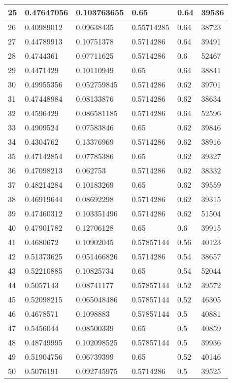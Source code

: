 \begin{longtable}{|l|l|l|l|l|l|}
25 & 0.47647056 & 0.103763655 & 0.65 & 0.64 & 39536 \\ \hline 
26 & 0.40989012 & 0.09638435 & 0.55714285 & 0.64 & 38723 \\ \hline 
27 & 0.44789913 & 0.10751378 & 0.5714286 & 0.64 & 39491 \\ \hline 
28 & 0.4744361 & 0.07711625 & 0.5714286 & 0.6 & 52467 \\ \hline 
29 & 0.4471429 & 0.10110949 & 0.65 & 0.64 & 38841 \\ \hline 
30 & 0.49955356 & 0.052759845 & 0.5714286 & 0.62 & 39701 \\ \hline 
31 & 0.47448984 & 0.08133876 & 0.5714286 & 0.62 & 38634 \\ \hline 
32 & 0.4596429 & 0.086581185 & 0.5714286 & 0.64 & 52596 \\ \hline 
33 & 0.4909524 & 0.07583846 & 0.65 & 0.62 & 39846 \\ \hline 
34 & 0.4304762 & 0.13376969 & 0.5714286 & 0.62 & 38916 \\ \hline 
35 & 0.47142854 & 0.07785386 & 0.65 & 0.62 & 39327 \\ \hline 
36 & 0.47098213 & 0.062753 & 0.5714286 & 0.62 & 38332 \\ \hline 
37 & 0.48214284 & 0.10183269 & 0.65 & 0.62 & 39559 \\ \hline 
38 & 0.46919644 & 0.08692298 & 0.5714286 & 0.62 & 39315 \\ \hline 
39 & 0.47460312 & 0.103351496 & 0.5714286 & 0.62 & 51504 \\ \hline 
40 & 0.47901782 & 0.12706128 & 0.65 & 0.6 & 39915 \\ \hline 
41 & 0.4680672 & 0.10902045 & 0.57857144 & 0.56 & 40123 \\ \hline 
42 & 0.51373625 & 0.051466826 & 0.5714286 & 0.54 & 38657 \\ \hline 
43 & 0.52210885 & 0.10825734 & 0.65 & 0.54 & 52044 \\ \hline 
44 & 0.5057143 & 0.08741177 & 0.57857144 & 0.52 & 39572 \\ \hline 
45 & 0.52098215 & 0.065048486 & 0.57857144 & 0.52 & 46305 \\ \hline 
46 & 0.4678571 & 0.1098883 & 0.57857144 & 0.5 & 40881 \\ \hline 
47 & 0.5456044 & 0.08500339 & 0.65 & 0.5 & 40859 \\ \hline 
48 & 0.48749995 & 0.102098525 & 0.57857144 & 0.5 & 39936 \\ \hline 
49 & 0.51904756 & 0.06739399 & 0.65 & 0.52 & 40146 \\ \hline 
50 & 0.5076191 & 0.092745975 & 0.5714286 & 0.5 & 39525 \\ \hline 
\end{longtable}